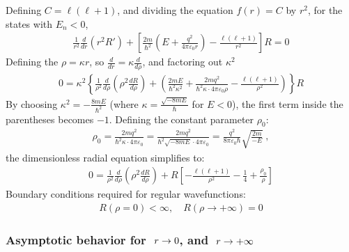 \documentclass[letterpaper,10pt,english]{jupyterBook}
\begin{document}
\sphinxAtStartPar
Defining \(C = \ell(\ell+1)\), and dividing the equation \(f(r) = C\) by \(r^2\), for the states with \(E_n <0\),
\begin{equation*}
\begin{split}\frac{1}{r^2} \frac{d}{dr} \left( r^2 R' \right) + \left[ \frac{2m}{\hbar^2} \left( E + \frac{q^2}{4\pi \varepsilon_0 r} \right) - \frac{\ell(\ell + 1)}{r^2} \right] R = 0\end{split}
\end{equation*}
\sphinxAtStartPar
Defining the  \(\rho = \kappa r\), so \(\frac{d}{dr} = \kappa \frac{d}{d\rho}\), and factoring out \(\kappa^2\)
\begin{equation*}
\begin{split}0 = \kappa^2 \left\{ \frac{1}{\rho^2} \frac{d}{d\rho} \left( \rho^2 \frac{dR}{d\rho} \right) + \left( \frac{2m E}{\hbar^2 \kappa^2} + \frac{2m q^2}{\hbar^2 \kappa \cdot 4\pi \varepsilon_0 \rho} - \frac{\ell(\ell + 1)}{\rho^2} \right) \right\} R\end{split}
\end{equation*}
\sphinxAtStartPar
By choosing \(\kappa^2 = -\frac{8 m E}{\hbar^2}\) (where \(\kappa = \frac{\sqrt{-8 m E}}{\hbar}\) for \(E < 0\)), the first term inside the parentheses becomes \(-1\). Defining the constant parameter \(\rho_0\):
\begin{equation*}
\begin{split}\rho_0 = \frac{2m q^2}{\hbar^2 \kappa \cdot 4\pi \varepsilon_0} = \frac{2m q^2}{\hbar^2 \sqrt{-8 m E} \cdot 4\pi \varepsilon_0} = \frac{q^2}{8\pi \varepsilon_0 \hbar} \sqrt{\frac{2m}{-E}} \ ,\end{split}
\end{equation*}
\sphinxAtStartPar
the dimensionless radial equation simplifies to:
\begin{equation*}
\begin{split}0 = \frac{1}{\rho^2} \frac{d}{d\rho} \left( \rho^2 \frac{dR}{d\rho} \right) + R \left[ - \frac{\ell(\ell + 1)}{\rho^2} - \frac{1}{4} + \frac{\rho_0}{\rho} \right]\end{split}
\end{equation*}
\sphinxAtStartPar
Boundary conditions required for regular wavefunctions:
\begin{equation*}
\begin{split}R(\rho = 0) < \infty, \quad R(\rho \to +\infty) = 0\end{split}
\end{equation*}\subsubsection*{Asymptotic behavior for \protect\(\ r \rightarrow 0\protect\), and \protect\(\ r \rightarrow +\infty\protect\)}
\end{document}
